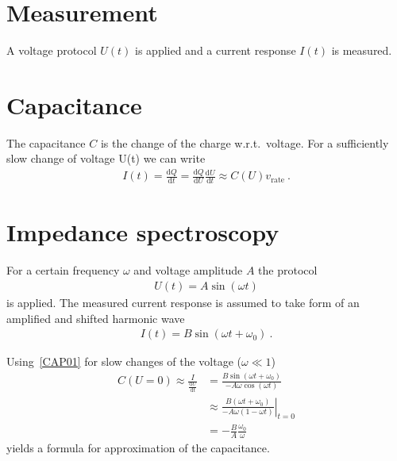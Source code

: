 \documentclass[a4 paper]{article}
\newcommand{\dd}{\mathrm{d}}
\begin{document}
\section{Measurement}
A voltage protocol $U(t)$ is applied and a current response $I(t)$ is measured.
\section{Capacitance}
% 
The capacitance $C$ is the change of the charge w.r.t.\ voltage.
For a sufficiently slow change of voltage U(t) we can write
\begin{align}
    I(t) = \frac{\dd Q}{\dd t} = \frac{\dd Q}{\dd U} \frac{\dd U}{\dd t} \approx C(U) v_{\text{rate}}~.
    \label{CAP01}
\end{align}

\section{Impedance spectroscopy}
For a certain frequency $\omega$ and voltage amplitude $A$ the protocol
\begin{align}
    U(t) = A \sin \left( \omega t \right) 
\end{align}
is applied. The measured current response is assumed to take form of
an amplified and shifted harmonic wave
\begin{align}
    I(t) = B \sin \left( \omega t  + \omega_0 \right) ~.
\end{align}

Using~\eqref{CAP01} for slow changes of the voltage ($\omega \ll 1$)
\begin{align}
    C(U=0) \approx \frac{I}{\frac{\dd U}{\dd t}} 
    &=  \frac{B \sin \left( \omega t+ \omega_0  \right)}
            {-A \omega\cos \left( \omega t  \right)}\\
            &\approx\left. \frac{B ( \omega t + \omega_0) }
                  {-A \omega \left( 1 - \omega t  \right)}\right|_{ t = 0}\\
    &= -\frac{B}{A} 
              \frac{\omega_0 }{\omega}   
\end{align}
yields a formula for approximation of the capacitance.
\end{document}
